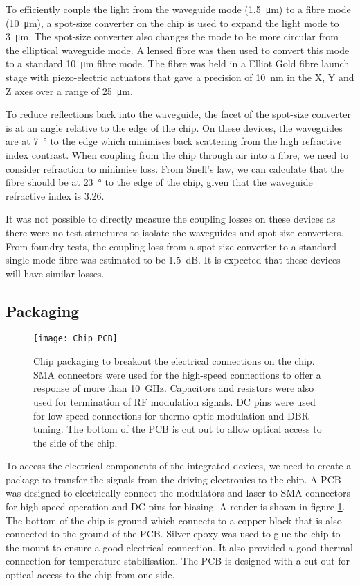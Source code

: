 To efficiently couple the light from the waveguide mode (\SI{1.5}{\um}) to a fibre mode (\SI{10}{\micro\metre}), a spot-size converter on the chip is used to expand the light mode to \SI{3}{\micro\meter}. The spot-size converter also changes the mode to be more circular from the elliptical waveguide mode. A lensed fibre was then used to convert this mode to a standard \SI{10}{\micro\meter} fibre mode. The fibre was held in a Elliot Gold fibre launch stage with piezo-electric actuators that gave a precision of \SI{10}{\nm} in the X, Y and Z axes over a range of \SI{25}{\micro\meter}.

To reduce reflections back into the waveguide, the facet of the spot-size converter is at an angle relative to the edge of the chip. On these devices, the waveguides are at \SI{7}{\degree} to the edge which minimises back scattering from the high refractive index contrast. When coupling from the chip through air into a fibre, we need to consider refraction to minimise loss. From Snell's law, we can calculate that the fibre should be at \SI{23}{\degree} to the edge of the chip, given that the waveguide refractive index is 3.26.

It was not possible to directly measure the coupling losses on these devices as there were no test structures to isolate the waveguides and spot-size converters. From foundry tests, the coupling loss from a spot-size converter to a standard single-mode fibre was estimated to be \SI{1.5}{dB}. It is expected that these devices will have similar losses.

\subsection{Packaging}

\begin{figure}[t]
	\centering
	\texttt{[image: Chip\_PCB]}
	\caption[Transmitter PCB package]{Chip packaging to breakout the electrical connections on the chip. SMA connectors were used for the high-speed connections to offer a response of more than \SI{10}{\GHz}. Capacitors and resistors were also used for termination of RF modulation signals. DC pins were used for low-speed connections for thermo-optic modulation and \acl{DBR} tuning. The bottom of the PCB is cut out to allow optical access to the side of the chip.}
	\label{fig:chip_pcb}
\end{figure}

To access the electrical components of the integrated devices, we need to create a package to transfer the signals from the driving electronics to the chip. A PCB was designed to electrically connect the modulators and laser to SMA connectors for high-speed operation and DC pins for biasing. A render is shown in figure \ref{fig:chip_pcb}. The bottom of the chip is ground which connects to a copper block that is also connected to the ground of the PCB. Silver epoxy was used to glue the chip to the mount to ensure a good electrical connection. It also provided a good thermal connection for temperature stabilisation. The PCB is designed with a cut-out for optical access to the chip from one side.

